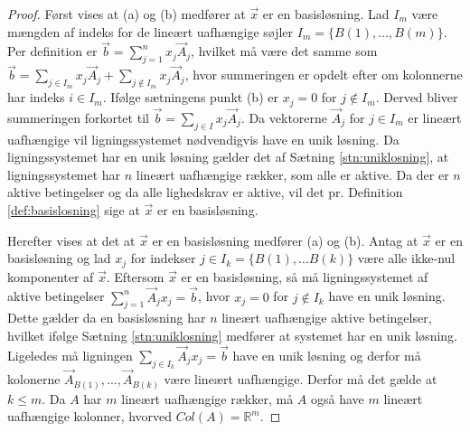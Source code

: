 \begin{proof}
Først vises at (a) og (b) medfører at $\vec{x}$ er en basisløsning.
Lad $I_m$ være mængden af indeks for de lineært uafhængige søjler  $I_m=\{B(1),\dots,B(m)\}$. Per definition er $\vec{b}=\sum_{j=1}^{n} x_j \vec{A}_j$, hvilket må være det samme som $\vec{b}=\sum_{j\in I_m} x_j \vec{A}_j+\sum_{j\notin I_m} x_j \vec{A}_j$, hvor summeringen er opdelt efter om kolonnerne har indeks $i \in I_m$. 
Ifølge sætningens punkt (b) er $x_j=0$ for $j \notin I_m$. Derved bliver summeringen forkortet til $\vec{b}=\sum_{j\in I}x_j \vec{A}_j$. Da vektorerne $\vec{A}_j$ for $j \in I_m$ er lineært uafhængige vil ligningssystemet nødvendigvis have en unik løsning. Da ligningssystemet har en unik løsning gælder det af Sætning \ref{stn:uniklosning}, at ligningssystemet har $n$ lineært uafhængige rækker, som alle er aktive. Da der er $n$ aktive betingelser og da alle lighedskrav er aktive, vil det pr. Definition \ref{def:basislosning} sige at $\vec{x}$ er en basisløsning.

% 

Herefter vises at det at $\vec{x}$ er en basisløsning medfører (a) og (b). Antag at $\vec{x}$ er en basisløsning og lad $x_j$ for indekser $j \in I_k=\{B(1),\dots B(k)\}$ være alle ikke-nul komponenter af $\vec{x}$.
Eftersom $\vec{x}$ er en basisløsning, så må ligningssystemet af aktive betingelser $\sum_{j=1}^{n}\vec{A}_jx_j=\vec{b}$, hvor $x_j=0$ for $j\notin I_k$ have en unik løsning. Dette gælder da en basisløsning har $n$ lineært uafhængige aktive betingelser, hvilket ifølge Sætning \ref{stn:uniklosning} medfører at systemet har en unik løsning. 
Ligeledes må ligningen $\sum_{j \in I_k}\vec{A}_jx_j=\vec{b}$ have en unik løsning og derfor må kolonerne $\vec{A}_{B(1)}, ..., \vec{A}_{B(k)}$ være lineært uafhængige. Derfor må det gælde at $k \leq m$. %
Da $A$ har $m$ lineært uafhængige rækker, må $A$ også have $m$ lineært uafhængige kolonner, hvorved $Col(A)=\mathds{R}^m$.


\end{proof}
